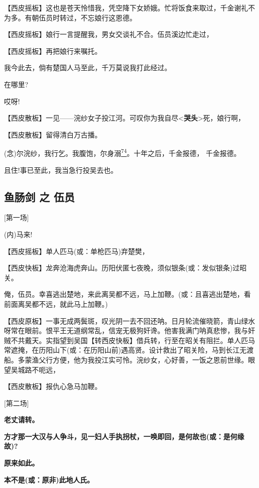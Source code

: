 【西皮摇板】这也是苍天怜惜我，凭空降下女娇娥。忙将饭食来取过，千金谢礼不为多。有朝伍员时转过，不忘娘行这恩德。

【西皮摇板】娘行一言提醒我，男女交谈礼不合。伍员溪边忙走过，

【西皮摇板】再把娘行来嘱托。

我今此去，倘有楚国人马至此，千万莫说我打此经过。

在哪里?

哎呀!

【西皮散板】一见------浣纱女子投江河。可叹你为我自尽\textless{}\textbf{哭头}\textgreater{}死，娘行啊，

【西皮散板】留得清白万古播。

(念)尔浣纱，我行乞。我腹饱，尔身溺\protect\hyperlink{fn74}{\textsuperscript{74}}。十年之后，千金报德，
千金报德。

且住!事已至此，我当急行投吴去也。

\newpage
\hypertarget{ux9c7cux80a0ux5251-ux4e4b-ux4f0dux5458}{%
\subsection{鱼肠剑 之
伍员}\label{ux9c7cux80a0ux5251-ux4e4b-ux4f0dux5458}}

{[}第一场{]}

(内)马来!

【西皮摇板】单人匹马(或：单枪匹马)弃楚樊，

【西皮快板】龙奔沧海虎奔山。历阳伏匿七夜晚，须似银条(或：发似银条)过昭关。

俺，伍员。幸喜逃出楚地，来此离吴都不远，马上加鞭。(或：且喜逃出楚地，看前面离吴都不远，就此马上加鞭。)

【西皮原板】一事无成两鬓斑，叹光阴一去不回还呐。日月轮流催晓箭，青山绿水呀常在眼前。恨平王无道纲常乱，信宠无极狗奸谗。他害我满门呐真悲惨，我与奸贼不共戴天。实指望到吴国【转西皮快板】借兵转，行至在昭关有阻拦。单人匹马常遮掩，在历阳山下(或：在历阳山前)遇高贤。设计救出了昭关险，马到长江无渡船。多蒙渔父行方便，他为我投江实可怜。浣纱女，心好善，一饭之恩前世缘。眼望吴城路不呃远，

【西皮散板】报仇心急马加鞭。

{[}第二场{]}

\textbf{老丈请转。}

\textbf{方才那一大汉与人争斗，见一妇人手执拐杖，一唤即回，是何故也(或：是何缘故)?}

\textbf{原来如此。}

\textbf{本不是(或：原非)此地人氏。}

